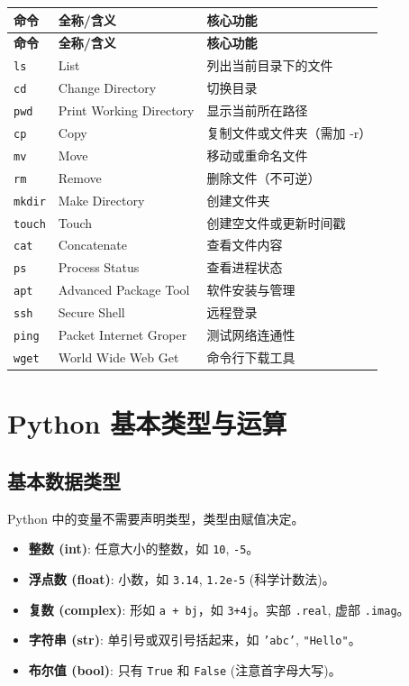 \documentclass[12pt, a4paper]{article}
\begin{document}
\begin{longtable}{p{2.5cm} p{4cm} p{7cm}}
\toprule
\textbf{命令} & \textbf{全称/含义} & \textbf{核心功能} \\
\midrule
\endfirsthead
\toprule
\textbf{命令} & \textbf{全称/含义} & \textbf{核心功能} \\
\midrule
\endhead
\bottomrule
\endfoot

\texttt{ls} & List & 列出当前目录下的文件 \\
\texttt{cd} & Change Directory & 切换目录 \\
\texttt{pwd} & Print Working Directory & 显示当前所在路径 \\
\texttt{cp} & Copy & 复制文件或文件夹（需加 -r） \\
\texttt{mv} & Move & 移动或重命名文件 \\
\texttt{rm} & Remove & 删除文件（不可逆） \\
\texttt{mkdir} & Make Directory & 创建文件夹 \\
\texttt{touch} & Touch & 创建空文件或更新时间戳 \\
\texttt{cat} & Concatenate & 查看文件内容 \\
\texttt{ps} & Process Status & 查看进程状态 \\
\texttt{apt} & Advanced Package Tool & 软件安装与管理 \\
\texttt{ssh} & Secure Shell & 远程登录 \\
\texttt{ping} & Packet Internet Groper & 测试网络连通性 \\
\texttt{wget} & World Wide Web Get & 命令行下载工具 \\
\bottomrule
\end{longtable}

\section{Python 基本类型与运算}

\subsection{基本数据类型}

Python 中的变量不需要声明类型，类型由赋值决定。

\begin{itemize}
    \item \textbf{整数 (int)}: 任意大小的整数，如 \texttt{10}, \texttt{-5}。
    \item \textbf{浮点数 (float)}: 小数，如 \texttt{3.14}, \texttt{1.2e-5} (科学计数法)。
    \item \textbf{复数 (complex)}: 形如 \texttt{a + bj}，如 \texttt{3+4j}。实部 \texttt{.real}, 虚部 \texttt{.imag}。
    \item \textbf{字符串 (str)}: 单引号或双引号括起来，如 \texttt{'abc'}, \texttt{"Hello"}。
    \item \textbf{布尔值 (bool)}: 只有 \texttt{True} 和 \texttt{False} (注意首字母大写)。
\end{itemize}
\end{document}
